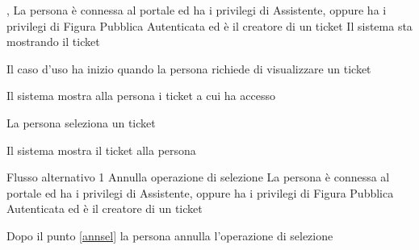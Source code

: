 
{, }
{La persona è connessa al portale ed ha i privilegi di Assistente, oppure ha i privilegi di Figura Pubblica Autenticata ed è il creatore di un ticket}
{Il sistema sta mostrando il ticket}
{\postNulle}
{\begin{enumCU}
	\item Il caso d'uso ha inizio quando la persona richiede di visualizzare un ticket
	\item Il sistema mostra alla persona i ticket a cui ha accesso\label{annsel}
	\item La persona seleziona un ticket
	\item Il sistema mostra il ticket alla persona
\end{enumCU}
}
%	
{Flusso alternativo 1}%
{Annulla operazione di selezione}%
{La persona è connessa al portale ed ha i privilegi di Assistente, oppure ha i privilegi di Figura Pubblica Autenticata ed è il creatore di un ticket}%
{\postNulle}%
{\begin{enumCU}
		\item Dopo il punto \ref{annsel} la persona annulla l'operazione di selezione
\end{enumCU}}%


